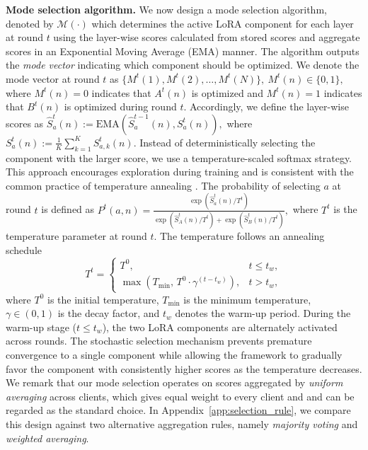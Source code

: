 \textbf{Mode selection algorithm.} We now design a mode selection algorithm, denoted by $\mathcal{M}(\cdot)$ which determines the active LoRA component for each layer at round $t$ using the layer-wise scores calculated from stored scores and aggregate scores in an Exponential Moving Average (EMA) manner. The algorithm outputs the \emph{mode vector} indicating which component should be optimized.  
We denote the mode vector at round $t$ as
$
\{M^t(1), M^t(2), \dots, M^t(N)\},~ M^t(n) \in \{0,1\},
$
where $M^t(n)=0$ indicates that $A^t(n)$ is optimized and $M^t(n)=1$ indicates that $B^t(n)$ is optimized during round $t$. 
Accordingly, we define the layer-wise scores as $
\hat{S}_a^t(n) := \mathrm{EMA}\!\left(\hat{S}_a^{t-1}(n), S_a^t(n)\right),
$
where $S_a^t(n):=\tfrac{1}{K}\sum_{k=1}^{K} S_{a,k}^t(n)$. Instead of deterministically selecting the component with the larger score, we use a temperature-scaled softmax strategy. 
This approach encourages exploration during training and is consistent with the common practice of temperature annealing \cite{jang2016categorical, maddison2016concrete}. The probability of selecting $a$ at round $t$ is defined as
$
P^t(a,n)=
\frac{\exp\!\left(\hat{S}_a^{t}(n)/T^t\right)}
{\exp\!\left(\hat{S}_A^{t}(n)/T^t\right)+\exp\!\left(\hat{S}_B^{t}(n)/T^t\right)},
$
where $T^t$ is the temperature parameter at round $t$.
The temperature follows an annealing schedule
\begin{equation}
T^t =
\begin{cases}
T^0, & t \le t_w, \\
\max\!\left(T_{\min},\, T^0 \cdot \gamma^{(t-t_w)}\right), & t > t_w ,
\end{cases}
\end{equation}
where $T^0$ is the initial temperature, $T_{\min}$ is the minimum temperature, $\gamma \in (0,1)$ is the decay factor, and $t_w$ denotes the warm-up period.
During the warm-up stage ($t \le t_w$), the two LoRA components are alternately activated across rounds. The stochastic selection mechanism prevents premature convergence to a single component while allowing the framework to gradually favor the component with consistently higher scores as the temperature decreases. We remark that our mode selection operates on scores aggregated by \emph{uniform averaging} across clients, which gives equal weight to every client and and can be regarded as the standard choice. In Appendix~\ref{app:selection_rule}, we compare this design against two alternative aggregation rules, namely \emph{majority voting} and \emph{weighted averaging}.
